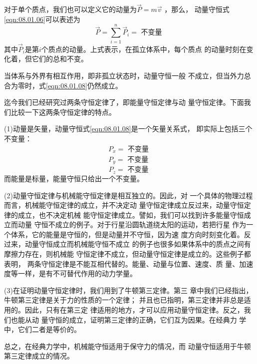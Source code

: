 对于单个质点，我们也可以定义它的动量为$ \vec { P } = m \vec { v } $ ，那么，
动量守恒\lhbrak 式\eqref{eqn:08.01.06}\rhbrak 可以表述为
\begin{equation}\label{eqn:08.01.08}
  \vec { P } = \sum _ { i = 1 } ^ { n } \vec { P } _ { i } = \text { 不变量 }
\end{equation}
其中$ \vec { P } _ { i } $是第$ i $个质点的动量。上式表示，在孤立体系中，每个质点
的动量时刻在变化着，但它们的总和不变。

当体系与外界有相互作用，即非孤立状态时，动量守恒一般
不成立，但当外力总合为零时，式\eqref{eqn:08.01.08}仍然成立。

迄今我们已经研究过两条守恒定律了，即能量守恒定律与动
量守恒定律。下面我们比较一下这两条守恒定律的特点。

(1)动量是矢量，动量守恒\lhbrak 式\eqref{eqn:08.01.08}\rhbrak 是一个矢量关系式，
即实际上包括三个不变量：
\begin{equation*}
  \begin{aligned}
    P _ { x } = \text { 不变量 } \\
    P _ { y } = \text { 不变量 }
  \end{aligned}
\end{equation*}
\begin{equation}\label{eqn:08.01.09}
  P _ { z } = \text { 不变量 }
\end{equation}
而能量是标量，能量守恒只给出一个不变量。

(2)动量守恒定律与机械能守恒定律是相互独立的。因此，对
一个具体的物理过程而言，机械能守恒定律的成立，并不决定动
量守恒定律成立反过来，动量守恒定律的成立，也不决定机械
能守恒定律成立。譬如，我们可以找到许多能量守恒成立而动量
守恒不成立的例子。对于行星沿圆轨道绕太阳的运动，若把行星
作为一个体系，它的能量是守恒的，但是动量并不守恒，因为速
度方向时刻变化着。反过来，动量守恒成立而机械能守恒不成立
的例子也很多如果体系中的质点之间有摩擦力存在，则机械能
守恒定律不成立，但动量守恒定律是成立的。这些例子都表明，
两条守恒定律是不能互相代替的。能量、动量与位置、速度、质
量、加速度等一样，是有不可替代作用的动力学量。

(3)在证明动量守恒定律时，我们用到了牛顿第三定律。第三
章中我们已经指出，牛顿第三定律是关于力的性质的一个定律；
并且也已指明，第三定律并非总是适用的。因此，只有在第三定
律适用的地方，才可以应用动量守恒定律。反之，我们也能从动
量守恒的成立，证明第三定律的正确，它们互为因果。在经典力
学中，它们二者是等价的。

总之，在经典力学中，机械能守恒适用于保守力的情况，而
动量守恒适用于牛顿第三定律成立的情况。

